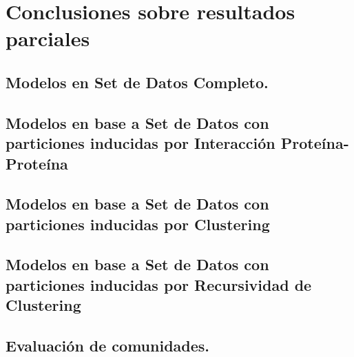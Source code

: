 \chapter{Conclusiones sobre resultados parciales}

\section{Modelos en Set de Datos Completo.}

\section{Modelos en base a Set de Datos con particiones inducidas por Interacci\'on Prote\'ina-Prote\'ina}

\section{Modelos en base a Set de Datos con particiones inducidas por Clustering}

\section{Modelos en base a Set de Datos con particiones inducidas por Recursividad de Clustering}

\section{Evaluaci\'on de comunidades.}

